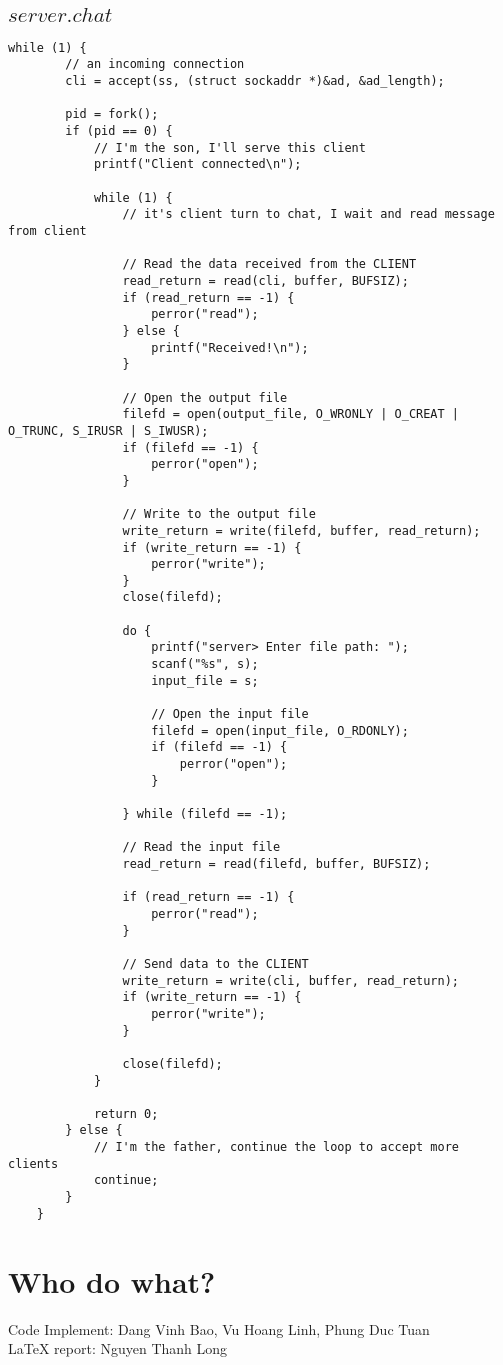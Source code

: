 \documentclass[12pt,a4paper]{article}
\begin{document}
\subsection*{$server.chat$}
\begin{lstlisting}
while (1) {
        // an incoming connection
        cli = accept(ss, (struct sockaddr *)&ad, &ad_length);

        pid = fork();
        if (pid == 0) {
            // I'm the son, I'll serve this client
            printf("Client connected\n");

            while (1) {
                // it's client turn to chat, I wait and read message from client

                // Read the data received from the CLIENT
                read_return = read(cli, buffer, BUFSIZ);
                if (read_return == -1) {
                    perror("read");
                } else {
                    printf("Received!\n");
                }

                // Open the output file
                filefd = open(output_file, O_WRONLY | O_CREAT | O_TRUNC, S_IRUSR | S_IWUSR);     
                if (filefd == -1) {
                    perror("open");
                }

                // Write to the output file
                write_return = write(filefd, buffer, read_return);
                if (write_return == -1) {
                    perror("write");
                }
                close(filefd);

                do {
                    printf("server> Enter file path: ");
                    scanf("%s", s);
                    input_file = s;

                    // Open the input file
                    filefd = open(input_file, O_RDONLY);
                    if (filefd == -1) {
                        perror("open");
                    }

                } while (filefd == -1);

                // Read the input file
                read_return = read(filefd, buffer, BUFSIZ);

                if (read_return == -1) {
                    perror("read");
                }

                // Send data to the CLIENT
                write_return = write(cli, buffer, read_return);
                if (write_return == -1) {
                    perror("write");
                }

                close(filefd);
            }

            return 0;
        } else {
            // I'm the father, continue the loop to accept more clients
            continue;
        }
    }
\end{lstlisting}
\section{Who do what?}
Code Implement: Dang Vinh Bao, Vu Hoang Linh, Phung Duc Tuan \\LaTeX report: Nguyen Thanh Long
\end{document}
